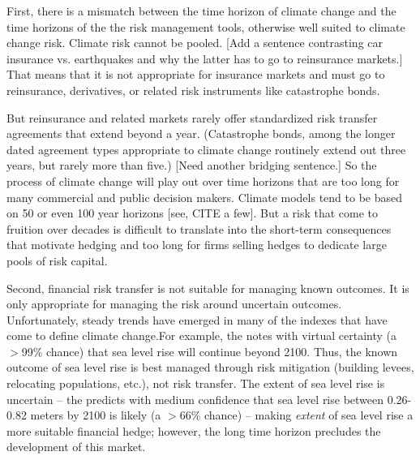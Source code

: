 \documentclass[authoryear]{article}
\begin{document}
First, there is a mismatch between the time horizon of climate change and the time horizons of the the risk management tools, otherwise well suited to climate change risk. Climate risk cannot be pooled. [Add a sentence contrasting car insurance vs. earthquakes and why the latter has to go to reinsurance markets.] That means that it is not appropriate for insurance markets and must go to reinsurance, derivatives, or related risk instruments like catastrophe bonds.
\begin{comment}
Before we say that reinsurance contracts are too short dated, lets say explicitly that this risk is headed for reinsurance markets
\end{comment}
But reinsurance and related markets rarely offer standardized risk transfer agreements that extend beyond a year. (Catastrophe bonds, among the longer dated agreement types appropriate to climate change routinely extend out three years, but rarely more than five.) [Need another bridging sentence.] So the process of climate change will play out over time horizons that are too long for many commercial and public decision makers. Climate models tend to be based on 50 or even 100 year horizons [see, CITE a few]. But a risk that come to fruition over decades is difficult to translate into the short-term consequences that motivate hedging and too long for firms selling hedges to dedicate large pools of risk capital. 

Second, financial risk transfer is not suitable for managing known outcomes. It is only appropriate for managing the risk around uncertain outcomes. %
Unfortunately, steady trends have emerged in many of the indexes that have come to define climate change.For example, the \citet{ipcc2013fifthReport} notes with virtual certainty (a $>$99\% chance) that sea level rise will continue beyond 2100. Thus, the known outcome of sea level rise is best managed through risk mitigation (building levees, relocating populations, etc.), not risk transfer. The extent of sea level rise is uncertain -- the \citet{ipcc2013fifthReport} predicts with medium confidence that sea level rise between 0.26-0.82 meters by 2100 is likely (a $>$66\% chance) -- making \textit{extent} of sea level rise a more suitable financial hedge; however, the long time horizon precludes the development of this market.
\end{document}
